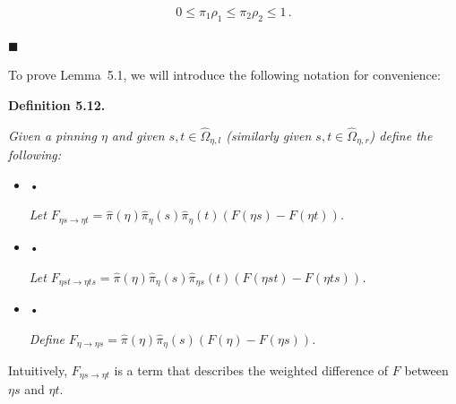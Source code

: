 \[\begin{gathered}
0\leq\pi_{1}\rho_{1}\leq\pi_{2}\rho_{2}\leq 1\,.
\end{gathered}\]




\ensuremath{\blacksquare}\par





To prove Lemma 5.1, we will introduce the following notation for convenience:\par





\par\medskip\noindent\textbf{\textbf{Definition 5.12}\textbf{.}}\par



\emph{Given a pinning $\eta$ and given $s,t\in\hat{\Omega}_{\eta,l}$ (similarly given $s,t\in\hat{\Omega}_{\eta,r}$) define the following:}\par




\begin{itemize}


\item[] • 


\emph{Let }$F_{\eta s\rightarrow\eta t}=\hat{\pi}(\eta)\hat{\pi}_{\eta}(s)\hat{\pi}_{\eta}(t)(F(\eta s)-F(\eta t))$\emph{.}\par




\item[] • 


\emph{Let }$F_{\eta st\rightarrow\eta ts}=\hat{\pi}(\eta)\hat{\pi}_{\eta}(s)\hat{\pi}_{\eta s}(t)(F(\eta st)-F(\eta ts))$\emph{.}\par




\item[] • 


\emph{Define }$F_{\eta\rightarrow\eta s}=\hat{\pi}(\eta)\hat{\pi}_{\eta}(s)(F(\eta)-F(\eta s))$\emph{.}\par




\end{itemize}






Intuitively, $F_{\eta s\rightarrow\eta t}$ is a term that describes the weighted difference of $F$ between $\eta s$ and $\eta t$.\par




